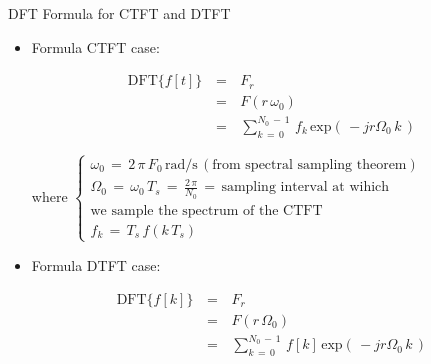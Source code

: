 \documentclass{beamer}
\begin{document}
\begin{frame}[t,allowframebreaks]{DFT Formula for CTFT and DTFT}

\begin{minipage}{\textwidth}


\begin{itemize}

\item Formula CTFT case:

\begin{equation}
\begin{array}{rcl}
\text{DFT}\{f[t]\} \, &=&\, F_r \\
						&=& \, F(r \, \omega_0) \\
					   &=&\, \displaystyle\sum_{k \, = \, 0}^{N_0 \, - \, 1} \, f_k \, \text{exp} \left(\, -j r \Omega_0 \, k   \,\right)
\end{array}
\end{equation}

where $\begin{cases}

\omega_0 \, = \, 2 \, \pi \, F_0 \, \text{rad/s} \, (\text{from spectral sampling theorem}) \\
\Omega_0 \, = \, \omega_0 \, T_s \, = \,   \displaystyle\frac{2 \, \pi}{N_0} \, = \, \text{sampling interval at wihich } \\
\text{we sample the spectrum of the CTFT} \\
f_k \, = \, T_s \, f(k \, T_s)
\end{cases}$ 


\end{itemize}


\end{minipage}


\begin{minipage}{\textwidth}


\begin{itemize}



\item Formula DTFT case:

\begin{equation}
\begin{array}{rcl}
\text{DFT}\{f[k]\} \, &=&\, F_r \\
						&=& \, F(r \, \Omega_0) \\
					   &=&\, \displaystyle\sum_{k \, = \, 0}^{N_0 \, - \, 1} \, f[k] \, \text{exp} \left(\, -j r \Omega_0 \, k   \,\right)
\end{array}
\label{Eq:DFT:dft_for_dtft}
\end{equation}


\end{itemize}
\end{minipage}
\end{frame}
\end{document}

